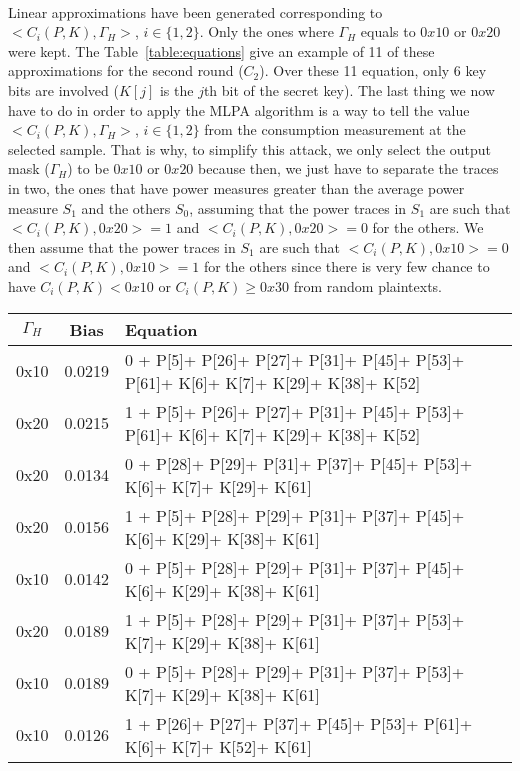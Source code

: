 \documentclass[11pt,a4paper]{article}
\begin{document}
{{{{{{{{{{{\paragraph{}
Linear approximations have been generated corresponding to $<C_i(P,K),\Gamma_H>$, $i\in\{1,2\}$. Only the ones where $\Gamma_H$ equals to $0x10$ or $0x20$ were kept. The Table~\ref{table:equations}
give an example of 11 of these approximations for the second round ($C_2$). Over these 11 equation, only 6 key bits are involved ($K[j]$ is the $j$th bit of the secret key). The last thing we 
now have to do in order to apply the MLPA algorithm is a way to tell the value $<C_i(P,K),\Gamma_H>$, $i\in\{1,2\}$ from the consumption measurement at the selected sample. That is why, to
simplify this attack, we only select the output mask ($\Gamma_H$) to be $0x10$ or $0x20$ because then, we just have to separate the traces in two, the ones that have power measures greater
than the average power measure $S_1$ and the others $S_0$, assuming that the power traces in $S_1$ are such that $<C_i(P,K),0x20> = 1$ and $<C_i(P,K), 0x20> = 0$ for the others. We then 
assume that the power traces in $S_1$ are such that $<C_i(P,K),0x10> = 0$ and $<C_i(P,K), 0x10> = 1$ for the others since there is very few chance to have $C_i(P,K) < 0x10$ or $C_i(P,K) \geq 0x30$
from random plaintexts.
\begin{table}[!h]
\tiny{
\begin{center}
\begin{tabular}{|c|c|l|}
\hline
$\Gamma_H$ & Bias & Equation \\
\hline
\hline
0x10 & 0.0219 & 0 + P[5]+ P[26]+ P[27]+ P[31]+ P[45]+ P[53]+ P[61]+ K[6]+ K[7]+ K[29]+ K[38]+ K[52] \\
0x20 & 0.0215 & 1 + P[5]+ P[26]+ P[27]+ P[31]+ P[45]+ P[53]+ P[61]+ K[6]+ K[7]+ K[29]+ K[38]+ K[52] \\
0x20 & 0.0134 & 0 + P[28]+ P[29]+ P[31]+ P[37]+ P[45]+ P[53]+ K[6]+ K[7]+ K[29]+ K[61] \\
0x20 & 0.0156 & 1 + P[5]+ P[28]+ P[29]+ P[31]+ P[37]+ P[45]+ K[6]+ K[29]+ K[38]+ K[61] \\
0x10 & 0.0142 & 0 + P[5]+ P[28]+ P[29]+ P[31]+ P[37]+ P[45]+ K[6]+ K[29]+ K[38]+ K[61] \\
0x20 & 0.0189 & 1 + P[5]+ P[28]+ P[29]+ P[31]+ P[37]+ P[53]+ K[7]+ K[29]+ K[38]+ K[61] \\
0x10 & 0.0189 & 0 + P[5]+ P[28]+ P[29]+ P[31]+ P[37]+ P[53]+ K[7]+ K[29]+ K[38]+ K[61] \\
0x10 & 0.0126 & 1 + P[26]+ P[27]+ P[37]+ P[45]+ P[53]+ P[61]+ K[6]+ K[7]+ K[52]+ K[61] \\

\end{tabular}
\end{center}}
\end{table}}}}}}}}}}}}
\end{document}
